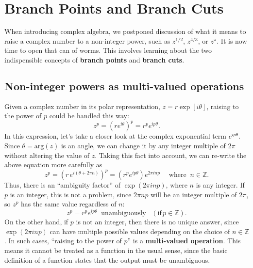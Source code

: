 \documentclass[10pt,a4paper]{article}
\begin{document}
\setcounter{page}{49}

\section{Branch Points and Branch Cuts}
\label{branch-points-and-branch-cuts}

When introducing complex algebra, we postponed discussion of what it
means to raise a complex number to a non-integer power, such as
$z^{1/2}$, $z^{4/3}$, or $z^{\pi}$. It is now time to open that
can of worms. This involves learning about the two indispensible
concepts of \textbf{branch points} and \textbf{branch cuts}.

\subsection{Non-integer powers as multi-valued operations}
\label{non-integer-powers-as-multi-valued-operations}

Given a complex number in its polar representation, $z =
r\exp[i\theta]$, raising to the power of $p$ could be handled this
way:
\begin{equation}
z^p = \left(re^{i\theta}\right)^p = r^p e^{ip\theta}.
\end{equation}
In this expression, let's take a closer look at the complex exponential
term $e^{ip\theta}$. Since $\theta = \mathrm{arg}(z)$ is an angle,
we can change it by any integer multiple of $2\pi$ without altering
the value of $z$. Taking this fact into account, we can re-write the
above equation more carefully as
\begin{equation}
z^p = \left(r\,e^{i(\theta + 2\pi n)}\right)^p = \left(r^p e^{ip\theta} \right) e^{2\pi i n p} \quad\; \mathrm{where}\;\; n\in\mathbb{Z}.
\end{equation}
Thus, there is an ``ambiguity factor'' of $\exp(2\pi i n p)$, where
$n$ is any integer. If $p$ is an integer, this is not a problem,
since $2\pi n p$ will be an integer multiple of $2\pi$, so $z^p$
has the same value regardless of $n$:
\begin{equation}
z^p = r^p e^{ip\theta} \;\;\textrm{unambiguously} \;\;\;(\text{if}\,p\in\mathbb{Z}).
\end{equation}
On the other hand, if $p$ is not an integer, then there is no unique
answer, since $\exp\left(2 \pi i np\right)$ can have multiple possible
values depending on the choice of $n \in \mathbb{Z}$. In such cases,
``raising to the power of $p$'' is a \textbf{multi-valued operation}.
This means it cannot be treated as a function in the usual sense,
since the basic definition of a function states that the output must
be unambiguous.
\end{document}
